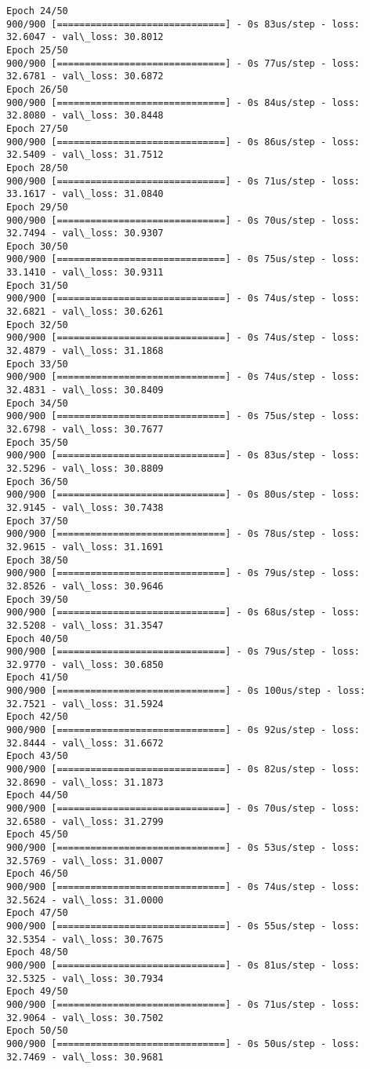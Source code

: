 \documentclass[11pt]{article}
\begin{document}
\begin{Verbatim}[commandchars=\\\{\}]
Epoch 24/50
900/900 [==============================] - 0s 83us/step - loss: 32.6047 - val\_loss: 30.8012
Epoch 25/50
900/900 [==============================] - 0s 77us/step - loss: 32.6781 - val\_loss: 30.6872
Epoch 26/50
900/900 [==============================] - 0s 84us/step - loss: 32.8080 - val\_loss: 30.8448
Epoch 27/50
900/900 [==============================] - 0s 86us/step - loss: 32.5409 - val\_loss: 31.7512
Epoch 28/50
900/900 [==============================] - 0s 71us/step - loss: 33.1617 - val\_loss: 31.0840
Epoch 29/50
900/900 [==============================] - 0s 70us/step - loss: 32.7494 - val\_loss: 30.9307
Epoch 30/50
900/900 [==============================] - 0s 75us/step - loss: 33.1410 - val\_loss: 30.9311
Epoch 31/50
900/900 [==============================] - 0s 74us/step - loss: 32.6821 - val\_loss: 30.6261
Epoch 32/50
900/900 [==============================] - 0s 74us/step - loss: 32.4879 - val\_loss: 31.1868
Epoch 33/50
900/900 [==============================] - 0s 74us/step - loss: 32.4831 - val\_loss: 30.8409
Epoch 34/50
900/900 [==============================] - 0s 75us/step - loss: 32.6798 - val\_loss: 30.7677
Epoch 35/50
900/900 [==============================] - 0s 83us/step - loss: 32.5296 - val\_loss: 30.8809
Epoch 36/50
900/900 [==============================] - 0s 80us/step - loss: 32.9145 - val\_loss: 30.7438
Epoch 37/50
900/900 [==============================] - 0s 78us/step - loss: 32.9615 - val\_loss: 31.1691
Epoch 38/50
900/900 [==============================] - 0s 79us/step - loss: 32.8526 - val\_loss: 30.9646
Epoch 39/50
900/900 [==============================] - 0s 68us/step - loss: 32.5208 - val\_loss: 31.3547
Epoch 40/50
900/900 [==============================] - 0s 79us/step - loss: 32.9770 - val\_loss: 30.6850
Epoch 41/50
900/900 [==============================] - 0s 100us/step - loss: 32.7521 - val\_loss: 31.5924
Epoch 42/50
900/900 [==============================] - 0s 92us/step - loss: 32.8444 - val\_loss: 31.6672
Epoch 43/50
900/900 [==============================] - 0s 82us/step - loss: 32.8690 - val\_loss: 31.1873
Epoch 44/50
900/900 [==============================] - 0s 70us/step - loss: 32.6580 - val\_loss: 31.2799
Epoch 45/50
900/900 [==============================] - 0s 53us/step - loss: 32.5769 - val\_loss: 31.0007
Epoch 46/50
900/900 [==============================] - 0s 74us/step - loss: 32.5624 - val\_loss: 31.0000
Epoch 47/50
900/900 [==============================] - 0s 55us/step - loss: 32.5354 - val\_loss: 30.7675
Epoch 48/50
900/900 [==============================] - 0s 81us/step - loss: 32.5325 - val\_loss: 30.7934
Epoch 49/50
900/900 [==============================] - 0s 71us/step - loss: 32.9064 - val\_loss: 30.7502
Epoch 50/50
900/900 [==============================] - 0s 50us/step - loss: 32.7469 - val\_loss: 30.9681

    \end{Verbatim}
\end{document}
